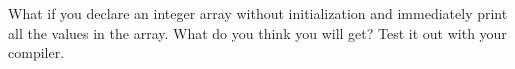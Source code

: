 What if you declare an integer array without initialization and immediately print all the values in the array. What do you think you will get? Test it out with your compiler.

